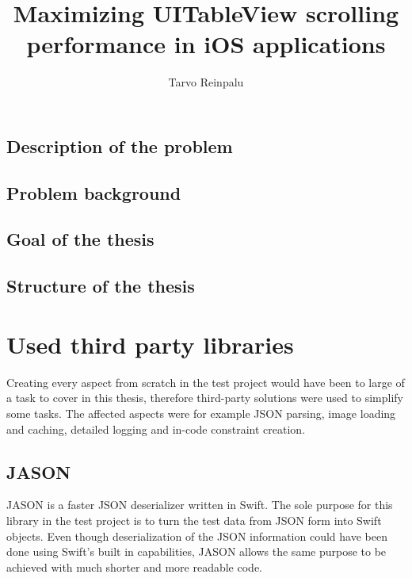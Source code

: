\documentclass[a4paper,12pt]{article}
\begin{document}
\begin{itkTitlePage}
\title{Maximizing UITableView scrolling performance in iOS applications}
\author{Tarvo Reinpalu}
\end{itkTitlePage}


\itkMakeAuthorDeclaration

\clearpage
\thispagestyle{empty}
\tableofcontents
\newpage


\newpage

\subsection*{Description of the problem}

\subsection*{Problem background}

\subsection*{Goal of the thesis}

\subsection*{Structure of the thesis}


\newpage
\section{Used third party libraries}
Creating every aspect from scratch in the test project would have been to large of a task to cover in this thesis,
therefore third-party solutions were used to simplify some tasks. The affected aspects were for example JSON parsing,
image loading and caching, detailed logging and in-code constraint creation.

\subsection{JASON}
JASON is a faster JSON deserializer written in Swift.\cite{JASON} The sole purpose for this library in the test
project is to turn the test data from JSON form into Swift objects. Even though deserialization of the JSON information
could have been done using Swift's built in capabilities, JASON allows the same purpose to be achieved with much shorter
and more readable code.
\end{document}
